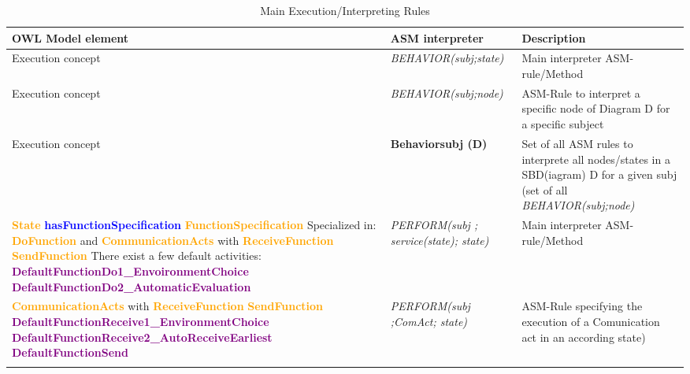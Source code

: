 \begin{landscape}
	\begin {longtable} {| p{} | p{} | p{}|}
	\hline
	OWL Model element &   ASM interpreter & Description\\
	\toprule
	\endhead
	\hline
	
	Execution concept
	& \textit{BEHAVIOR(subj;state)} 
	&  Main interpreter ASM-rule/Method
	\\
	\hline
	
		Execution concept
	& \textit{BEHAVIOR(subj;node)}
	& ASM-Rule to interpret a specific node of Diagram D for a specific subject
	\\
	\hline
	
		Execution concept
	& \textbf{Behaviorsubj (D)}
	&  Set of all ASM rules to interprete all nodes/states in a SBD(iagram) D for a given subj (set of all \textit{BEHAVIOR(subj;node)}
	\\
	\hline
	
		\textcolor{orange}{\textbf{State}} \textcolor{blue}{\textbf{hasFunctionSpecification}} \textcolor{orange}{\textbf{FunctionSpecification}}
		\newline
		Specialized in:
			\newline
		\textcolor{orange}{\textbf{DoFunction}} and
			\newline
		\textcolor{orange}{\textbf{CommunicationActs}} with
			\newline
		\textcolor{orange}{\textbf{ReceiveFunction}}
			\newline
		\textcolor{orange}{\textbf{SendFunction}}
			\newline
		There exist a few default activities:
			\newline
		\textcolor{purple}{\textbf{DefaultFunctionDo1\_EnvoironmentChoice}}
			\newline
		\textcolor{purple}{\textbf{DefaultFunctionDo2\_AutomaticEvaluation}}
	& \textit{PERFORM(subj ; service(state); state)}
	&  Main interpreter ASM-rule/Method
	\\
	\hline
	
	\textcolor{orange}{\textbf{CommunicationActs}} with
	\newline
	\textcolor{orange}{\textbf{ReceiveFunction}}
	\newline
	\textcolor{orange}{\textbf{SendFunction}}
	\newline
	\textcolor{purple}{\textbf{DefaultFunctionReceive1\_EnvironmentChoice}}
	\newline
	\textcolor{purple}{\textbf{DefaultFunctionReceive2\_AutoReceiveEarliest}}
	\newline
	\textcolor{purple}{\textbf{DefaultFunctionSend}}
	& \textit{PERFORM(subj ;ComAct; state)}
	&  ASM-Rule specifying the execution of a Comunication act in an according state)
	\\
	\hline
	
\caption{Main Execution/Interpreting Rules}
\label{tab:places-Entities}
\end{longtable}
\end {landscape}


